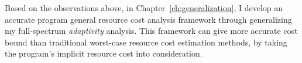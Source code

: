  Based on the observations above, in Chapter~\ref{ch:generalization},
 I develop
 an accurate program general resource cost analysis framework through generalizing my full-spectrum \emph{adaptivity} analysis.
 This framework can give more accurate cost bound than traditional worst-case resource cost estimation methods,
 by taking the program's implicit resource cost into consideration.

